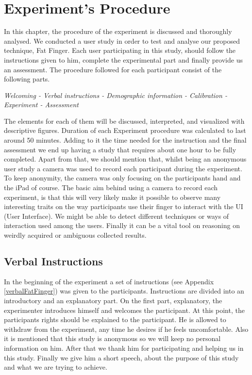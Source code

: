 \section{Experiment's Procedure}


In this chapter, the procedure of the experiment is discussed and thoroughly analysed. We conducted a user study in order to test and analyse our proposed technique, Fat Finger. Each user participating in this study, should follow the instructions given to him, complete the experimental part and finally provide us an assessment. The procedure followed for each participant consist of the following parts. 

\emph{Welcoming - Verbal instructions - Demographic information  - Calibration - Experiment - Assessment}


The elements for each of them will be discussed, interpreted, and visualized with descriptive figures. Duration of each Experiment procedure was calculated to last around 50 minutes. Adding to it the time needed for the instruction and the final assessment we end up having a study that requires about one hour to be fully completed. Apart from that, we should mention that, whilst being an anonymous user study a camera was used to record each participant during the experiment. To keep anonymity, the camera was only focusing on the participants hand and the iPad of course. The basic aim behind using a camera to record each experiment, is that this will very likely make it possible to observe many interesting traits on the way participants use their finger to interact with the UI (User Interface). We might be able to detect different techniques or ways of interaction used among the users. Finally it can be a vital tool on reasoning on weirdly acquired or ambiguous 
collected results.
\subsection{Verbal Instructions}

In the beginning of the experiment a set of instructions (see Appendix \ref{verbalFatFinger}) was given to the participants. Instructions are divided into an introductory and an explanatory part. On the first part, explanatory, the experimenter introduces himself and welcomes the participant. At this point, the participants rights should be explained to the participant. He is allowed to withdraw from the experiment, any time he desires if he feels uncomfortable. Also it is mentioned that this study is anonymous so we will keep no personal information on him. After that we thank him for participating and helping us in this study. Finally we give him a short speech, about the purpose of this study and what we are trying to achieve.

